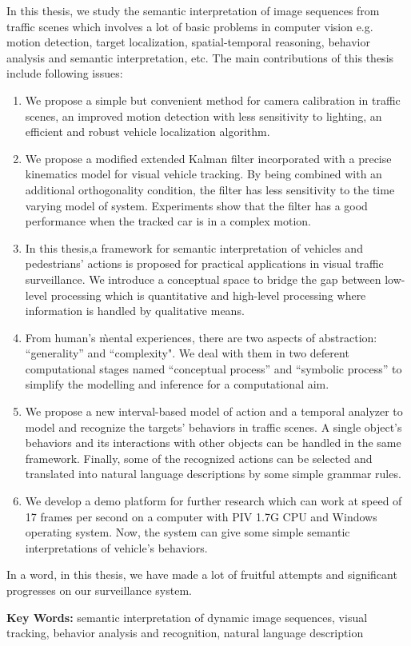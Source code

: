 In this thesis, we study the semantic interpretation of image sequences from traffic
scenes which involves a lot of basic problems in computer vision e.g. motion
detection, target localization, spatial-temporal reasoning, behavior analysis and
semantic interpretation, etc. The main contributions of this thesis include
following issues:
\begin{enumerate}
    \item We propose a simple but convenient method for camera calibration in
    traffic scenes, an improved motion detection with less sensitivity to lighting,
    an efficient and robust vehicle localization algorithm.
    \item We propose a modified extended Kalman filter incorporated with a precise
    kinematics model for visual vehicle tracking. By being combined with an additional orthogonality
    condition, the filter has less sensitivity to the time varying model of system. Experiments
    show that the filter has a good performance when the tracked car is in a complex motion.
    \item In this thesis,a framework for semantic interpretation of vehicles and pedestrians'
    actions is proposed for practical applications in visual traffic surveillance.  We introduce
    a conceptual space to bridge the gap between low-level processing which is quantitative
    and high-level processing where information is handled by qualitative means.
    \item From human's \`mental experiences, there are two aspects of abstraction: ``generality'' and
    ``complexity". We deal with them in two deferent computational stages named ``conceptual process'' and ``symbolic process'' to
    simplify the modelling and inference for a computational aim.
    \item We propose a new interval-based model of action and a temporal analyzer to model and
    recognize the targets' behaviors in traffic scenes. A single object's behaviors and its
    interactions with other objects can be handled in the same framework. Finally, some of the recognized
    actions can be selected and translated into natural language descriptions by some simple grammar
    rules.
    \item We develop a demo platform for further research which can work at
    speed of 17 frames per second on a computer with PIV 1.7G CPU and Windows
    operating system. Now, the system can give some simple semantic interpretations
    of vehicle's behaviors.
\end{enumerate}

In a word, in this thesis, we have made a lot of fruitful attempts and significant
progresses on our surveillance system.

\noindent \textbf{Key Words:} semantic interpretation of dynamic image sequences,
visual tracking, behavior analysis and recognition, natural language description
